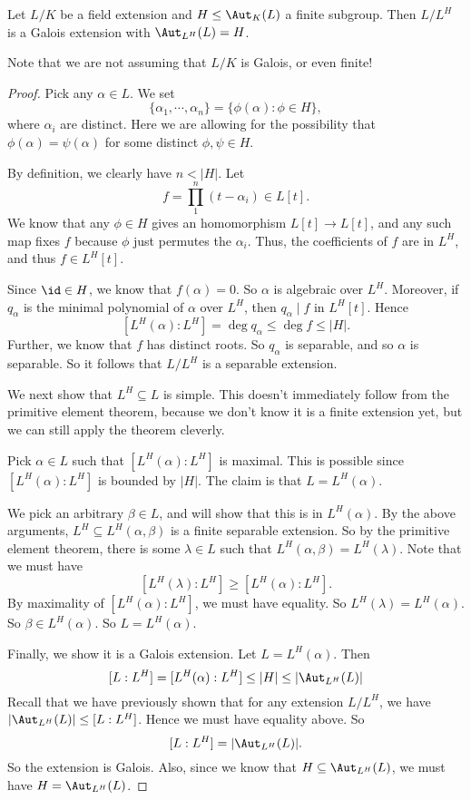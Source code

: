 \documentclass[a4paper]{article}
\begin{document}
\begin{lemma}
  Let $L/K$ be a field extension and $H\leq \Aut_K(L)$ a finite subgroup. Then $L/L^H$ is a Galois extension with $\Aut_{L^H}(L) = H$.
\end{lemma}
Note that we are not assuming that $L/K$ is Galois, or even finite!
\begin{proof}
  Pick any $\alpha \in L$. We set
  \[
    \{\alpha_1,\cdots, \alpha_n\} = \{\phi(\alpha): \phi \in H\},
  \]
  where $\alpha_i$ are distinct. Here we are allowing for the possibility that $\phi(\alpha) = \psi(\alpha)$ for some distinct $\phi, \psi \in H$.

  By definition, we clearly have $n < |H|$. Let
  \[
    f = \prod_1^n (t - \alpha_i) \in L[t].
  \]
  We know that any $\phi \in H$ gives an homomorphism $L[t] \to L[t]$, and any such map fixes $f$ because $\phi$ just permutes the $\alpha_i$. Thus, the coefficients of $f$ are in $L^H$, and thus $f \in L^H[t]$.

  Since $\id \in H$, we know that $f(\alpha) = 0$. So $\alpha$ is algebraic over $L^H$. Moreover, if $q_\alpha$ is the minimal polynomial of $\alpha$ over $L^H$, then $q_\alpha \mid f$ in $L^H[t]$. Hence
  \[
    [L^H(\alpha): L^H] = \deg q_\alpha \leq \deg f \leq |H|.
  \]
  Further, we know that $f$ has distinct roots. So $q_\alpha$ is separable, and so $\alpha$ is separable. So it follows that $L/L^H$ is a separable extension.

  We next show that $L^H\subseteq L$ is simple. This doesn't immediately follow from the primitive element theorem, because we don't know it is a finite extension yet, but we can still apply the theorem cleverly.

  Pick $\alpha \in L$ such that $[L^H(\alpha): L^H]$ is maximal. This is possible since $[L^H(\alpha):L^H]$ is bounded by $|H|$. The claim is that $L = L^H(\alpha)$.

  We pick an arbitrary $\beta \in L$, and will show that this is in $L^H(\alpha)$. By the above arguments, $L^H\subseteq L^H(\alpha, \beta)$ is a finite separable extension. So by the primitive element theorem, there is some $\lambda \in L$ such that $L^H(\alpha, \beta) = L^H(\lambda)$. Note that we must have
  \[
    [L^H(\lambda): L^H] \geq [L^H(\alpha): L^H].
  \]
  By maximality of $[L^H(\alpha): L^H]$, we must have equality. So $L^H(\lambda) = L^H(\alpha)$. So $\beta \in L^H(\alpha)$. So $L = L^H(\alpha)$.

  Finally, we show it is a Galois extension. Let $L = L^H(\alpha)$. Then
  \[
    [L:L^H] = [L^H(\alpha): L^H] \leq |H| \leq |\Aut_{L^H}(L)|
  \]
  Recall that we have previously shown that for any extension $L/L^H$, we have $|\Aut_{L^H}(L)| \leq [L:L^H]$. Hence we must have equality above. So
  \[
    [L:L^H] = |\Aut_{L^H}(L)|.
  \]
  So the extension is Galois. Also, since we know that $H\subseteq \Aut_{L^H}(L)$, we must have $H = \Aut_{L^H}(L)$.
\end{proof}
\end{document}
